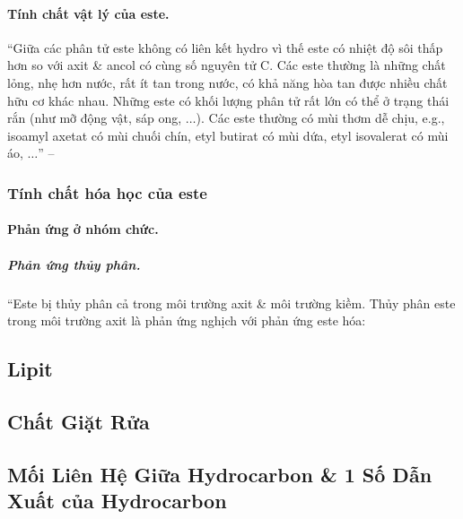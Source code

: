 \documentclass{article}
\numberwithin{equation}{section}
\begin{document}
\paragraph{Tính chất vật lý của este.} ``Giữa các phân tử este không có liên kết hydro vì thế este có nhiệt độ sôi thấp hơn so với axit \& ancol có cùng số nguyên tử C. Các este thường là những chất lỏng, nhẹ hơn nước, rất ít tan trong nước, có khả năng hòa tan được nhiều chất hữu cơ khác nhau. Những este có khối lượng phân tử rất lớn có thể ở trạng thái rắn (như mỡ động vật, sáp ong, $\ldots$). Các este thường có mùi thơm dễ chịu, e.g., isoamyl axetat có mùi chuối chín, etyl butirat có mùi dứa, etyl isovalerat có mùi áo, $\ldots$'' -- \cite[pp. 4--5]{SGK_Hoa_Hoc_12_nang_cao}

\subsubsection{Tính chất hóa học của este}

\paragraph{Phản ứng ở nhóm chức.}

\subparagraph{Phản ứng thủy phân.} ``Este bị thủy phân cả trong môi trường axit \& môi trường kiềm. Thủy phân este trong môi trường axit là phản ứng nghịch với phản ứng este hóa:


\subsection{Lipit}


\subsection{Chất Giặt Rửa}


\subsection{Mối Liên Hệ Giữa Hydrocarbon \& 1 Số Dẫn Xuất của Hydrocarbon}

\end{document}

